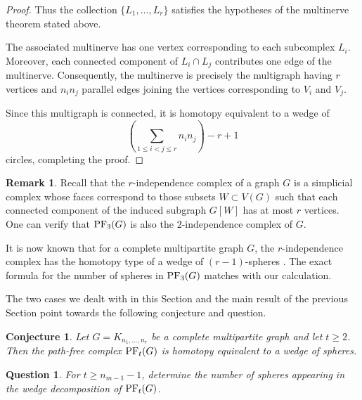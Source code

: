 \documentclass[12pt,reqno]{amsart}
\newtheorem{question}[question]{Question}
\newtheorem{conjecture}[conjecture]{Conjecture}
\theoremstyle{definition}
\newtheorem{remark}[remark]{Remark}
\newcommand{\PF}{{\rm PF}}
\begin{document}
\begin{proof}
Thus the collection
$\{L_1,\ldots,L_r\}$
satisfies the hypotheses of the multinerve theorem stated above.

The associated multinerve has one vertex corresponding to each subcomplex $L_i$. Moreover, each connected component of
$L_i\cap L_j$
contributes one edge of the multinerve. Consequently, the multinerve is precisely the multigraph having
$r$
vertices and
$n_in_j$
parallel edges joining the vertices corresponding to $V_i$ and $V_j$.

Since this multigraph is connected, it is homotopy equivalent to a wedge of
\[
\left(\sum_{1\le i<j\le r}n_in_j\right)-r+1
\]
circles, completing the proof.
\end{proof}

\begin{remark}
    Recall that the $r$-independence complex of a graph $G$ is a simplicial complex whose faces correspond to those subsets $W\subset V(G)$ such that each connected component of the induced subgraph $G[W]$ has at most $r$ vertices. 
    One can verify that $\PF_3(G)$ is also the $2$-independence complex of $G$. 

    It is now known that for a complete multipartite graph $G$, the $r$-independence complex has the homotopy type of a wedge of $(r-1)$-spheres \cite[Theorem 3.5]{DS21}. 
    The exact formula for the number of spheres in $\PF_3(G)$ matches with our calculation. 
\end{remark}


The two cases we dealt with in this Section and the main result of the previous Section point towards the following conjecture and question. 

\begin{conjecture}
Let $G=K_{n_1,\ldots,n_r}$ be a complete multipartite graph and let $t\ge 2$.
Then the path-free complex $\PF_t(G)$ is homotopy equivalent to a wedge
of spheres. 
\end{conjecture}

\begin{question}
For $t\geq n_{m-1}-1$, determine the number of spheres appearing in the wedge decomposition of $\PF_t(G)$. 
\end{question}


\end{document}
